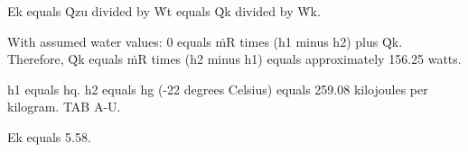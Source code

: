 Ek equals Q̇zu divided by Ẇt equals Q̇k divided by Ẇk.  

With assumed water values:  
0 equals ṁR times (h1 minus h2) plus Q̇k.  
Therefore, Q̇k equals ṁR times (h2 minus h1) equals approximately 156.25 watts.  

h1 equals hq.  
h2 equals hg (-22 degrees Celsius) equals 259.08 kilojoules per kilogram.  
TAB A-U.  

Ek equals 5.58.